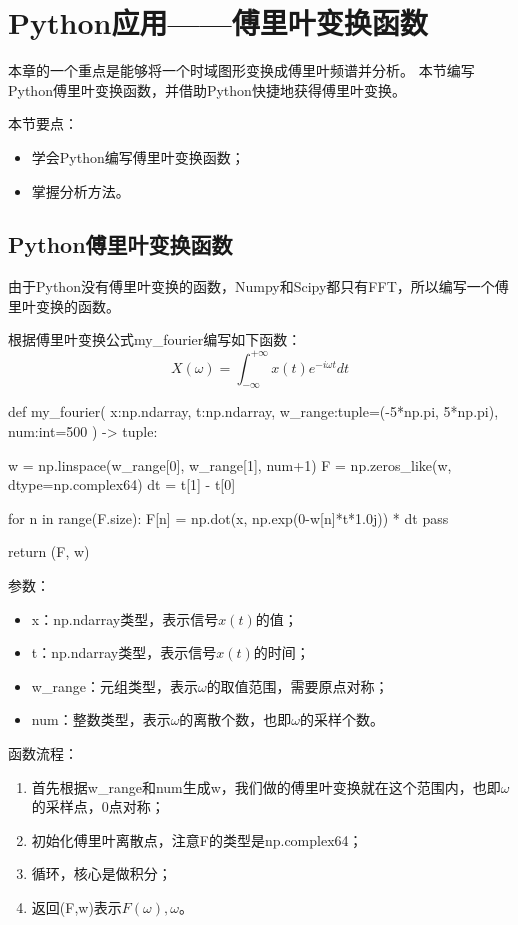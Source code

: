 \section{Python应用——傅里叶变换函数}

本章的一个重点是能够将一个时域图形变换成傅里叶频谱并分析。
本节编写Python傅里叶变换函数，并借助Python快捷地获得傅里叶变换。

本节要点：
\begin{itemize}
    \item 学会Python编写傅里叶变换函数；
    \item 掌握分析方法。
\end{itemize}

\subsection{Python傅里叶变换函数}

由于Python没有傅里叶变换的函数，Numpy和Scipy都只有FFT，所以编写一个傅里叶变换的函数。

根据傅里叶变换公式my\_fourier编写如下函数：
\[
X\left( \omega \right) =\int_{-\infty}^{+\infty}{x\left( t \right) e^{-i\omega t}dt}
\]

\begin{python}
def my_fourier(
        x:np.ndarray, t:np.ndarray,
        w_range:tuple=(-5*np.pi, 5*np.pi), num:int=500
        ) -> tuple:

    w = np.linspace(w_range[0], w_range[1], num+1)
    F = np.zeros_like(w, dtype=np.complex64)
    dt = t[1] - t[0]

    for n in range(F.size):
        F[n] = np.dot(x, np.exp(0-w[n]*t*1.0j)) * dt
        pass

    return (F, w)
\end{python}

参数：
\begin{itemize}
    \item x：np.ndarray类型，表示信号$x\left( t \right) $的值；
    \item t：np.ndarray类型，表示信号$x\left( t \right) $的时间；
    \item w\_range：元组类型，表示$\omega $的取值范围，需要原点对称；
    \item num：整数类型，表示$\omega $的离散个数，也即$\omega $的采样个数。
\end{itemize}

函数流程：
\begin{enumerate}
    \item 首先根据w\_range和num生成w，我们做的傅里叶变换就在这个范围内，也即$\omega $的采样点，0点对称；
    \item 初始化傅里叶离散点，注意F的类型是np.complex64；
    \item 循环，核心是做积分；
    \item 返回(F,w)表示$F\left( \omega \right) ,\omega $。
\end{enumerate}

